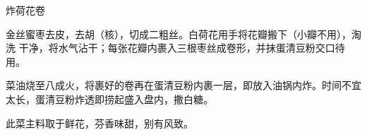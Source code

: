 \begin{recipe}{炸荷花卷}

\ingredients


\preparation

金丝蜜枣去皮，去胡（核），切成二粗丝。白荷花用手将花瓣搬下（小瓣不用），淘洗
干净，将水气沾干；每张花瓣内裹入三根枣丝成卷形，并抹蛋清豆粉交口待用。

\step 菜油烧至八成火，将裹好的卷再在蛋清豆粉内裹一层，即放入油锅内炸。时间不宜
太长，蛋清豆粉炸透即捞起盛入盘内，撒白糖。

\features

此菜主料取于鲜花，芬香味甜，别有风致。

\end{recipe}

